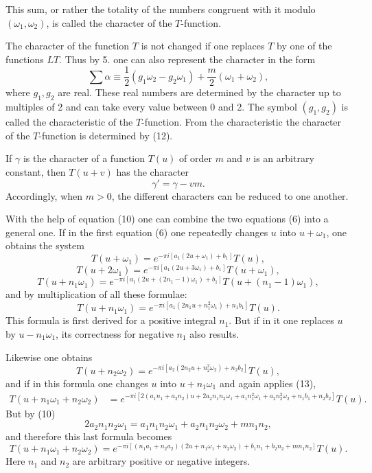 \documentclass[11pt]{article}
\begin{document}
This sum, or rather the totality of the numbers congruent with it modulo $(\omega_1,\omega_2)$, is called the character of the $T$-function.

The character of the function $T$ is not changed if one replaces $T$ by one of the functions $LT$. Thus by 5. one can also represent the character in the form
\begin{equation}
\sum\alpha\equiv \frac12(g_1\omega_2-g_2\omega_1)+\frac{m}{2}(\omega_1+\omega_2),
\tag{12}
\end{equation}
where $g_1,g_2$ are real. These real numbers are determined by the character up to multiples of 2 and can take every value between 0 and 2. The symbol $(g_1,g_2)$ is called the characteristic of the $T$-function. From the characteristic the character of the $T$-function is determined by (12).

If $\gamma$ is the character of a function $T(u)$ of order $m$ and $v$ is an arbitrary constant, then $T(u+v)$ has the character
\[
\gamma'=\gamma-vm.
\]
Accordingly, when $m>0$, the different characters can be reduced to one another.

With the help of equation (10) one can combine the two equations (6) into a general one. If in the first equation (6) one repeatedly changes $u$ into $u+\omega_1$, one obtains the system
\[
T(u+\omega_1)=e^{-\pi i[a_1(2u+\omega_1)+b_1]}T(u),
\]
\[
T(u+2\omega_1)=e^{-\pi i[a_1(2u+3\omega_1)+b_1]}T(u+\omega_1),
\]
\[
T(u+n_1\omega_1)=e^{-\pi i[a_1(2u+(2n_1-1)\omega_1)+b_1]}T(u+(n_1-1)\omega_1),
\]
and by multiplication of all these formulae:
\begin{equation}
T(u+n_1\omega_1)=e^{-\pi i[a_1(2n_1u+n_1^2\omega_1)+n_1b_1]}T(u).
\tag{13}
\end{equation}
This formula is first derived for a positive integral $n_1$. But if in it one replaces $u$ by $u-n_1\omega_1$, its correctness for negative $n_1$ also results.

Likewise one obtains
\begin{equation}
T(u+n_2\omega_2)=e^{-\pi i[a_2(2n_2u+n_2^2\omega_2)+n_2b_2]}T(u),
\tag{14}
\end{equation}
and if in this formula one changes $u$ into $u+n_1\omega_1$ and again applies (13),
\begin{equation}
\begin{aligned}
T(u+n_1\omega_1+n_2\omega_2)
&=e^{-\pi i[2(a_1n_1+a_2n_2)u+2a_2n_1n_2\omega_1+a_1n_1^2\omega_1+a_2n_2^2\omega_2+n_1b_1+n_2b_2]}T(u).
\end{aligned}
\tag{15}
\end{equation}
But by (10)
\[
2a_2n_1n_2\omega_1=a_1n_1n_2\omega_1+a_2n_1n_2\omega_2+mn_1n_2,
\]
and therefore this last formula becomes
\begin{equation}
T(u+n_1\omega_1+n_2\omega_2)
=e^{-\pi i[(n_1a_1+n_2a_2)(2u+n_1\omega_1+n_2\omega_2)+b_1n_1+b_2n_2+mn_1n_2]}T(u).
\tag{16}
\end{equation}
Here $n_1$ and $n_2$ are arbitrary positive or negative integers.
\end{document}
